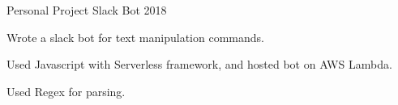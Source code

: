 \begin{cventries}

  \cventry
    {Personal Project} %
    {Slack Bot} %
    {} %
    {2018} %
    {
      \begin{cvitems} %
        \item {Wrote a slack bot for text manipulation commands.}
        \item {Used Javascript with Serverless framework, and hosted bot on AWS Lambda.}
        \item {Used Regex for parsing.}
      \end{cvitems}
    }

\end{cventries}